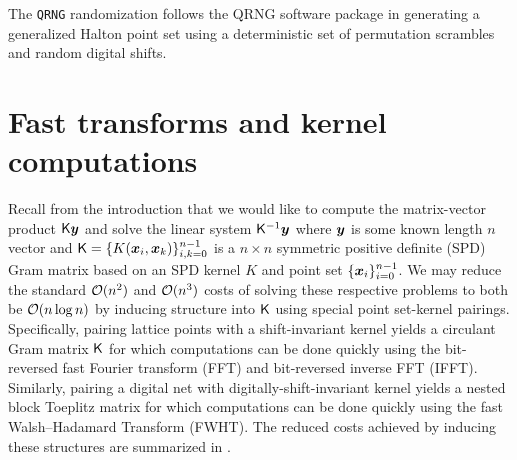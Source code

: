 \documentclass[acmsmall]{acmart}
\begin{document}
\begin{listing}[H]
    \inputminted{python}{snippets/halton.txt}
    \caption{Generate randomized Halton points.}
    \label{code:halton}
\end{listing}

\noindent The \texttt{QRNG} randomization follows the QRNG software package \citep{qrng.software} in generating a generalized Halton point set \citep{faure2009generalized} using a deterministic set of  permutation scrambles and random digital shifts. 

\section{Fast transforms and kernel computations} \label{sec:fast_transforms}

Recall from the introduction that we would like to compute the matrix-vector product ${\mathsf{K}} {\boldsymbol{y}}$ and solve the linear system ${\mathsf{K}}^{-1} {\boldsymbol{y}}$ where ${\boldsymbol{y}}$ is some known length $n$ vector and ${\mathsf{K}} = \{K({\boldsymbol{x}}_i,{\boldsymbol{x}}_k)\}_{i,k=0}^{n-1}$ is a $n \times n$ symmetric positive definite (SPD) Gram matrix based on an SPD kernel $K$ and point set $\{{\boldsymbol{x}}_i\}_{i=0}^{n-1}$. We may reduce the standard ${\mathcal{O}}(n^2)$ and ${\mathcal{O}}(n^3)$ costs of solving these respective problems to both be ${\mathcal{O}}(n \log n)$ by inducing structure into ${\mathsf{K}}$ using special point set-kernel pairings. Specifically, pairing lattice points with a shift-invariant kernel yields a circulant Gram matrix ${\mathsf{K}}$ for which computations can be done quickly using the bit-reversed fast Fourier transform (FFT) and bit-reversed inverse FFT (IFFT). Similarly, pairing a digital net with digitally-shift-invariant kernel yields a nested block Toeplitz matrix for which computations can be done quickly using the fast Walsh--Hadamard Transform (FWHT). The reduced costs achieved by inducing these structures are summarized in .
\end{document}
